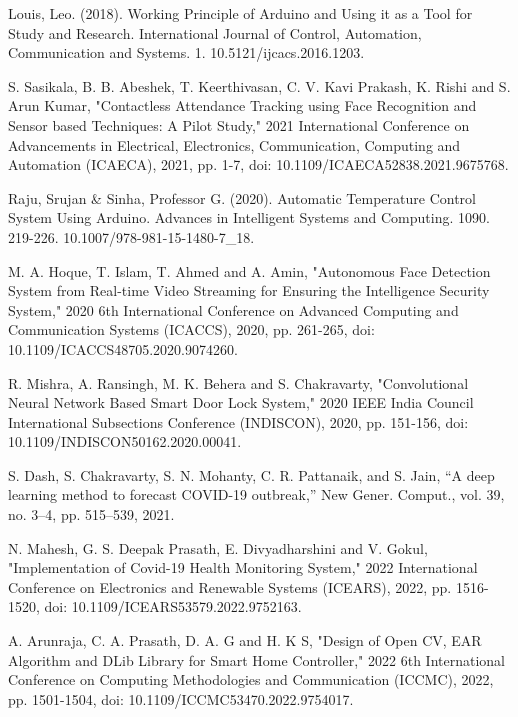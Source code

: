 \documentclass[conference]{IEEEtran}
\begin{document}
	\begin{thebibliography}{1}
		
		Louis, Leo. (2018). Working Principle of Arduino and Using it as a Tool for Study and Research. International Journal of Control, Automation, Communication and Systems. 1. 10.5121/ijcacs.2016.1203.
		
		S. Sasikala, B. B. Abeshek, T. Keerthivasan, C. V. Kavi Prakash, K. Rishi and S. Arun Kumar, "Contactless Attendance Tracking using Face Recognition and Sensor based Techniques: A Pilot Study," 2021 International Conference on Advancements in Electrical, Electronics, Communication, Computing and Automation (ICAECA), 2021, pp. 1-7, doi: 10.1109/ICAECA52838.2021.9675768.
		
		Raju, Srujan \& Sinha, Professor G. (2020). Automatic Temperature Control System Using Arduino. Advances in Intelligent Systems and Computing. 1090. 219-226. 10.1007/978-981-15-1480-7\_18. 
		
		M. A. Hoque, T. Islam, T. Ahmed and A. Amin, "Autonomous Face Detection System from Real-time Video Streaming for Ensuring the Intelligence Security System," 2020 6th International Conference on Advanced Computing and Communication Systems (ICACCS), 2020, pp. 261-265, doi: 10.1109/ICACCS48705.2020.9074260.
		
		R. Mishra, A. Ransingh, M. K. Behera and S. Chakravarty, "Convolutional Neural Network Based Smart Door Lock System," 2020 IEEE India Council International Subsections Conference (INDISCON), 2020, pp. 151-156, doi: 10.1109/INDISCON50162.2020.00041.
		
		S. Dash, S. Chakravarty, S. N. Mohanty, C. R. Pattanaik, and S. Jain, “A deep learning method to forecast COVID-19 outbreak,” New Gener. Comput., vol. 39, no. 3–4, pp. 515–539, 2021.
		
		N. Mahesh, G. S. Deepak Prasath, E. Divyadharshini and V. Gokul, "Implementation of Covid-19 Health Monitoring System," 2022 International Conference on Electronics and Renewable Systems (ICEARS), 2022, pp. 1516-1520, doi: 10.1109/ICEARS53579.2022.9752163.
		
		A. Arunraja, C. A. Prasath, D. A. G and H. K S, "Design of Open CV, EAR Algorithm and DLib Library for Smart Home Controller," 2022 6th International Conference on Computing Methodologies and Communication (ICCMC), 2022, pp. 1501-1504, doi: 10.1109/ICCMC53470.2022.9754017.
		

\end{thebibliography}
\end{document}
